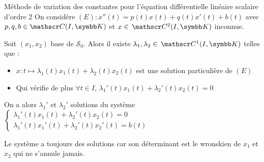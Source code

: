 \begin{theorement}{Méthode de variation des constantes pour l'équation différentielle linéaire scalaire d'ordre 2}{}
    On considère $(E) : x''(t) = p(t) x(t) + q(t) x'(t) + b(t)$ avec $p, q, b \in \mathscr C(I, \K)$ et $x \in \mc 2(I, \K)$ inconnue.

    \svspace
    
    Soit $(x_1, x_2)$ base de $\mathscr S_0$. Alors il existe 
    $\lambda_1, \lambda_2 \in \mc 1(I, \K)$ telles que :
    \begin{itemize}
        \item $x : t \mapsto \lambda_1(t) x_1(t) + \lambda_2(t) x_2(t)$ est une solution particulière de $(E)$
        \item Qui vérifie de plus $\forall t \in I$, $\lambda_1'(t) x_1(t) + \lambda_2'(t) x_2(t) = 0$
    \end{itemize}

    \svspace

    On a alors $\lambda_1'$ et $\lambda_2'$ solutions du système 
    $\begin{cases}
    \lambda_1'(t) x_1(t) + \lambda_2'(t) x_2(t) = 0 \\
    \lambda_1'(t) x_1'(t) + \lambda_2'(t) x_2'(t) = b(t)
    \end{cases}$
\end{theorement}

\begin{remarque}
    Le système a toujours des solutions car son déterminant est le wronskien de $x_1$ et $x_2$ qui ne s'annule jamais.
\end{remarque}


